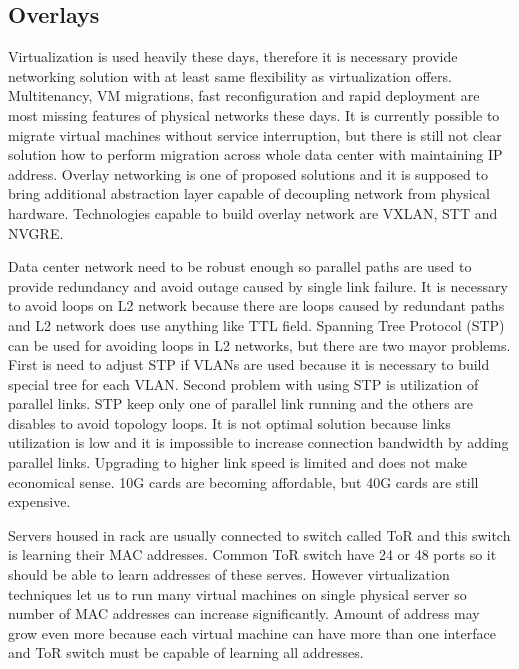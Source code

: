 \subsection{Overlays}
Virtualization is used heavily these days, therefore it is necessary provide networking solution with at least same flexibility as virtualization offers. Multitenancy, \Ac{VM} migrations, fast reconfiguration and rapid deployment are most missing features of physical networks these days. It is currently possible to migrate virtual machines without service interruption, but there is still not clear solution how to perform migration across whole data center with maintaining \Ac{IP} address. Overlay networking is one of proposed solutions and it is supposed to bring additional abstraction layer capable of decoupling network from physical hardware. 
Technologies capable to build overlay network are \Ac{VXLAN}, \Ac{STT} and \Ac{NVGRE}. 

Data center network need to be robust enough so parallel paths are used to provide redundancy and avoid outage caused by single link failure. It is necessary to avoid loops on L2 network because there are loops caused by redundant paths and L2 network does use anything like \Ac{TTL} field.  Spanning Tree Protocol (\Ac{STP}) can be used for avoiding loops in L2 networks, but there are two mayor problems. First is need to adjust \Ac{STP} if \Ac{VLAN}s are used because it is necessary to build special tree for each \Ac{VLAN}. Second problem with using \Ac{STP} is utilization of parallel links. \Ac{STP} keep only one of parallel link running and the others are disables to avoid topology loops. It is not optimal solution because links utilization is low and it is impossible to increase connection bandwidth by adding parallel links. Upgrading to higher link speed is limited and does not make economical sense. 10G cards are becoming affordable, but 40G cards are still expensive.

Servers housed in rack are usually connected to switch called \Ac{ToR} and this switch is learning their \Ac{MAC} addresses. Common \Ac{ToR} switch have 24 or 48 ports so it should be able to learn addresses of these serves. However virtualization techniques let us to run many virtual machines on single physical server so number of \Ac{MAC} addresses can increase significantly. Amount of address may grow even more because each virtual machine can have more than one interface and \Ac{ToR} switch must be capable of learning all addresses.

